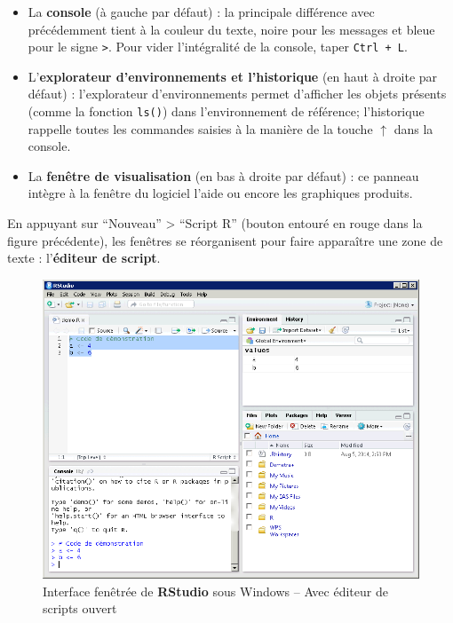 \documentclass[12pt,twosided, notitlepage]{book}
\providecommand{\tightlist}{%
  \setlength{\itemsep}{0pt}\setlength{\parskip}{0pt}}
\begin{document}
\begin{itemize}
\tightlist
\item
  La \textbf{console} (à gauche par défaut) : la principale différence
  avec précédemment tient à la couleur du texte, noire pour les messages
  et bleue pour le signe \texttt{\textgreater{}}. Pour vider
  l'intégralité de la console, taper \texttt{Ctrl\ +\ L}.
\item
  L'\textbf{explorateur d'environnements et l'historique} (en haut à
  droite par défaut) : l'explorateur d'environnements permet d'afficher
  les objets présents (comme la fonction \texttt{ls()}) dans
  l'environnement de référence; l'historique rappelle toutes les
  commandes saisies à la manière de la touche \(\uparrow\) dans la
  console.
\item
  La \textbf{fenêtre de visualisation} (en bas à droite par défaut) : ce
  panneau intègre à la fenêtre du logiciel l'aide ou encore les
  graphiques produits.
\end{itemize}

En appuyant sur \enquote{Nouveau} \textgreater{} \enquote{Script R}
(bouton entouré en rouge dans la figure précédente), les fenêtres se
réorganisent pour faire apparaître une zone de texte : l'\textbf{éditeur
de script}.

\begin{figure}[htbp]
\centering
\includegraphics{../figures/Interface_RStudio_2.png}
\caption{Interface fenêtrée de \textbf{RStudio} sous Windows -- Avec
éditeur de scripts ouvert}
\end{figure}
\end{document}
